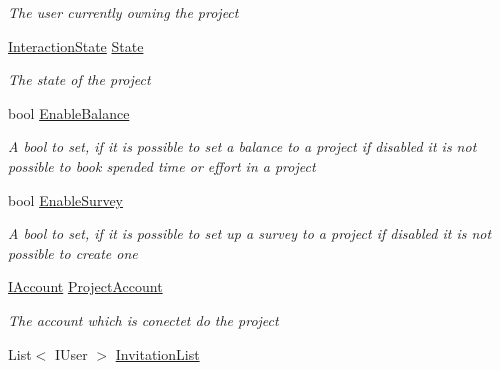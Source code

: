 \begin{DoxyCompactItemize}
\begin{DoxyCompactList}\small\item\em The user currently owning the project \end{DoxyCompactList}\item 
\hyperlink{namespace_plex_byte_1_1_mo_cap_1_1_interactions_afcb673d9186608b6bd3b187179aedc8a}{Interaction\+State} \hyperlink{class_plex_byte_1_1_mo_cap_1_1_interactions_1_1_project_ae322c2cd5f5b5a080c6f6f17badeaa2b}{State}
\begin{DoxyCompactList}\small\item\em The state of the project \end{DoxyCompactList}\item 
bool \hyperlink{class_plex_byte_1_1_mo_cap_1_1_interactions_1_1_project_a416293f2e592d5d42afecdd3a4f99737}{Enable\+Balance}
\begin{DoxyCompactList}\small\item\em A bool to set, if it is possible to set a balance to a project if disabled it is not possible to book spended time or effort in a project \end{DoxyCompactList}\item 
bool \hyperlink{class_plex_byte_1_1_mo_cap_1_1_interactions_1_1_project_a38db02bda9f7cb2d264dbc890da9321a}{Enable\+Survey}
\begin{DoxyCompactList}\small\item\em A bool to set, if it is possible to set up a survey to a project if disabled it is not possible to create one \end{DoxyCompactList}\item 
\hyperlink{interface_plex_byte_1_1_mo_cap_1_1_interactions_1_1_i_account}{I\+Account} \hyperlink{class_plex_byte_1_1_mo_cap_1_1_interactions_1_1_project_a453929da12473119b7d1d4bd21e986c4}{Project\+Account}
\begin{DoxyCompactList}\small\item\em The account which is conectet do the project \end{DoxyCompactList}\item 
List$<$ I\+User $>$ \hyperlink{class_plex_byte_1_1_mo_cap_1_1_interactions_1_1_project_afedd69d0ca0662b9c1b03431339b129d}{Invitation\+List}

\end{DoxyCompactItemize}

